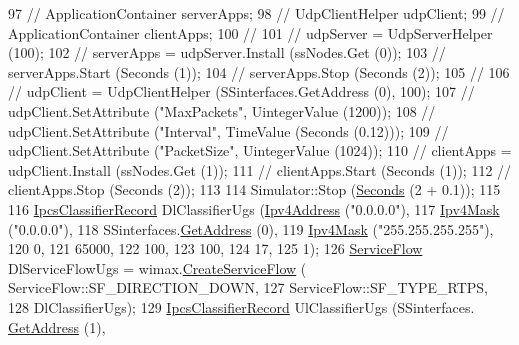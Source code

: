 \begin{DoxyCode}
97   \textcolor{comment}{//  ApplicationContainer serverApps;}
98   \textcolor{comment}{//  UdpClientHelper udpClient;}
99   \textcolor{comment}{//  ApplicationContainer clientApps;}
100   \textcolor{comment}{//}
101   \textcolor{comment}{//  udpServer = UdpServerHelper (100);}
102   \textcolor{comment}{//  serverApps = udpServer.Install (ssNodes.Get (0));}
103   \textcolor{comment}{//  serverApps.Start (Seconds (1));}
104   \textcolor{comment}{//  serverApps.Stop (Seconds (2));}
105   \textcolor{comment}{//}
106   \textcolor{comment}{//  udpClient = UdpClientHelper (SSinterfaces.GetAddress (0), 100);}
107   \textcolor{comment}{//  udpClient.SetAttribute ("MaxPackets", UintegerValue (1200));}
108   \textcolor{comment}{//  udpClient.SetAttribute ("Interval", TimeValue (Seconds (0.12)));}
109   \textcolor{comment}{//  udpClient.SetAttribute ("PacketSize", UintegerValue (1024));}
110   \textcolor{comment}{//  clientApps = udpClient.Install (ssNodes.Get (1));}
111   \textcolor{comment}{//  clientApps.Start (Seconds (1));}
112   \textcolor{comment}{//  clientApps.Stop (Seconds (2));}
113 
114   Simulator::Stop (\hyperlink{group__timecivil_ga33c34b816f8ff6628e33d5c8e9713b9e}{Seconds} (2 + 0.1));
115 
116   \hyperlink{classns3_1_1IpcsClassifierRecord}{IpcsClassifierRecord} DlClassifierUgs (\hyperlink{classns3_1_1Ipv4Address}{Ipv4Address} (\textcolor{stringliteral}{"0.0.0.0"}),
117                                         \hyperlink{classns3_1_1Ipv4Mask}{Ipv4Mask} (\textcolor{stringliteral}{"0.0.0.0"}),
118                                         SSinterfaces.\hyperlink{classns3_1_1Ipv4InterfaceContainer_ae63208dcd222be986822937ee4aa828c}{GetAddress} (0),
119                                         \hyperlink{classns3_1_1Ipv4Mask}{Ipv4Mask} (\textcolor{stringliteral}{"255.255.255.255"}),
120                                         0,
121                                         65000,
122                                         100,
123                                         100,
124                                         17,
125                                         1);
126   \hyperlink{classns3_1_1ServiceFlow}{ServiceFlow} DlServiceFlowUgs = wimax.\hyperlink{classns3_1_1WimaxHelper_aed0c1ffdcd62234c14965f899efc88c1}{CreateServiceFlow} (
      ServiceFlow::SF\_DIRECTION\_DOWN,
127                                                           ServiceFlow::SF\_TYPE\_RTPS,
128                                                           DlClassifierUgs);
129   \hyperlink{classns3_1_1IpcsClassifierRecord}{IpcsClassifierRecord} UlClassifierUgs (SSinterfaces.
      \hyperlink{classns3_1_1Ipv4InterfaceContainer_ae63208dcd222be986822937ee4aa828c}{GetAddress} (1),

\end{DoxyCode}
